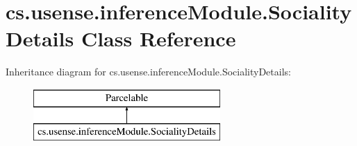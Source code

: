 \hypertarget{classcs_1_1usense_1_1inference_module_1_1_sociality_details}{}\section{cs.\+usense.\+inference\+Module.\+Sociality\+Details Class Reference}
\label{classcs_1_1usense_1_1inference_module_1_1_sociality_details}
Inheritance diagram for cs.\+usense.\+inference\+Module.\+Sociality\+Details\+:\begin{figure}[H]
\begin{center}
\leavevmode
\includegraphics[height=2.000000cm]{classcs_1_1usense_1_1inference_module_1_1_sociality_details}
\end{center}
\end{figure}
